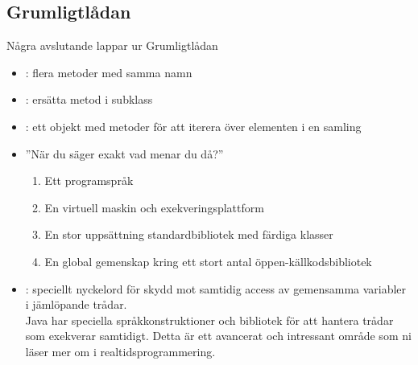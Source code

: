 \documentclass{lecturenotes}
\begin{document}
\subsection{Grumligtlådan}
\begin{Slide}{Några avslutande lappar ur Grumligtlådan}
\begin{itemize}
\item {}: flera metoder med samma namn
\item {}: ersätta metod i subklass
\item {}: ett objekt med metoder för att iterera över elementen i en samling
\item ''När du säger  exakt vad menar du då?''
\begin{enumerate}\footnotesize
\item Ett programspråk
\item En virtuell maskin och exekveringsplattform
\item En stor uppsättning standardbibliotek med färdiga klasser
\item En global gemenskap kring ett stort antal öppen-källkodsbibliotek
\end{enumerate}
\item {}: speciellt nyckelord för skydd mot samtidig access av gemensamma variabler i jämlöpande trådar. \\ \footnotesize Java har speciella språkkonstruktioner och bibliotek för att hantera trådar som exekverar samtidigt. Detta är ett avancerat och intressant område som ni läser mer om i realtidsprogrammering.
\end{itemize}
\end{Slide}

\end{document}
